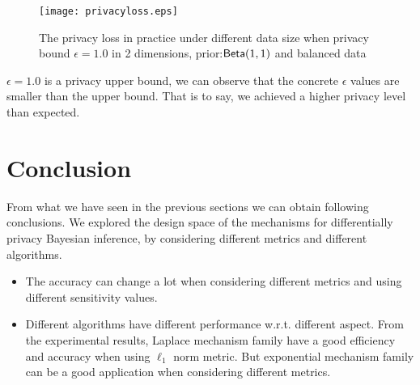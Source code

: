 \documentclass{article}
\begin{document}
\begin{figure}
\begin{center}
\centering
    \texttt{[image: privacyloss.eps]}
\caption{The privacy loss in practice under different data size when privacy bound $\epsilon = 1.0$ in 2 dimensions, prior:$\mathsf{Beta}(1,1)$ and balanced data}
\label{fig_privacy}
\end{center}
\end{figure}

$\epsilon = 1.0$ is a privacy upper bound, we can observe that the concrete $\epsilon$ values are smaller than the upper bound. That is to say, we achieved a higher privacy level than expected. 


\section{Conclusion}
From what we have seen in the previous sections we can obtain following conclusions. We explored the design space of the mechanisms for differentially privacy Bayesian inference, by considering different metrics and different algorithms.
\begin{itemize}
  \item The accuracy can change a lot when considering different metrics and using different sensitivity values.
  \item Different algorithms have different performance w.r.t. different aspect. From the experimental results, Laplace mechanism family have a good efficiency and accuracy when using $\ell_1$ norm metric. But exponential mechanism family can be a good application when considering different metrics.
\end{itemize}








\end{document}
